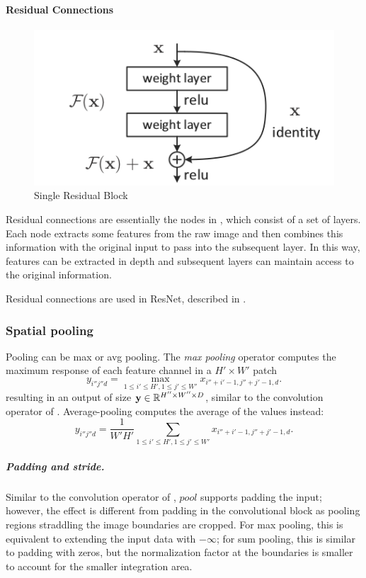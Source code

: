 \paragraph{Residual Connections}\label{s:blocks-resnet}
\begin{figure}[H]
	\centering
	\includegraphics[scale=0.5]{images/resnet}
	\caption{Single Residual Block}
	\label{f:blocks-res}
\end{figure}
Residual connections are essentially the nodes in , which consist of a set of layers. Each node extracts some features from the raw image and then combines this information with the original input to pass into the subsequent layer. In this way, features can be extracted in depth and subsequent layers can maintain access to the original information.

Residual connections are used in ResNet, described in .


\subsubsection{Spatial pooling}\label{s:pooling}

Pooling can be max or avg pooling. The \emph{max pooling} operator computes the maximum response of each feature channel in a $H' \times W'$ patch
\[
y_{i''j''d} = \max_{1\leq i' \leq H', 1 \leq j' \leq W'} x_{i''+i'-1,j''+j'-1,d}.
\]
resulting in an output of size $\mathbf{y}\in\mathbb{R}^{H''\times W'' \times D}$, similar to the convolution operator of . Average-pooling computes the average of the values instead:
\[
y_{i''j''d} = \frac{1}{W'H'}
\sum_{1\leq i' \leq H', 1 \leq j' \leq W'} x_{i''+i'-1,j''+j'-1,d}.
\]


\subparagraph{Padding and stride.} Similar to the convolution operator of , $pool$ supports padding the input; however, the effect is different from padding in the convolutional block as pooling regions straddling the image boundaries are cropped. For max pooling, this is equivalent to extending the input data with $-\infty$; for sum pooling, this is similar to padding with zeros, but the normalization factor at the boundaries is smaller to account for the smaller integration area.
\pagebreak
